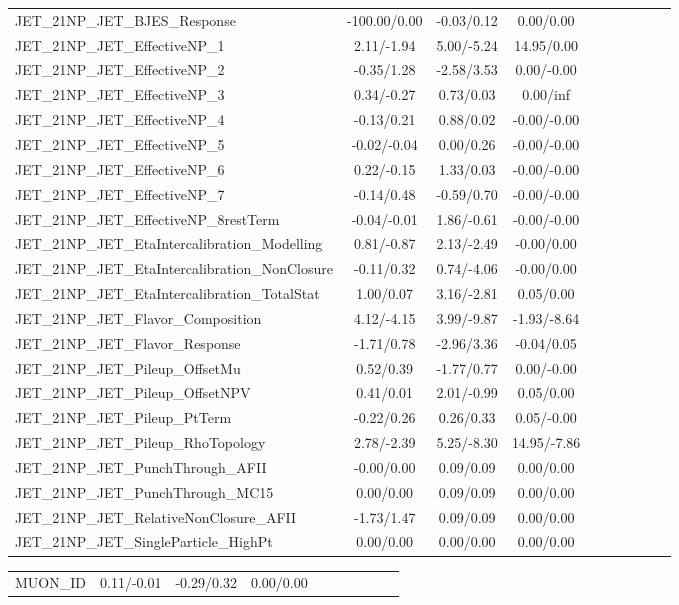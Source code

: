 \begin{table}[h]
\begin{center}
\begin{tabular}{l|ccccccccc}
JET\_21NP\_JET\_BJES\_Response &-100.00/0.00 &-0.03/0.12 &0.00/0.00 \\
JET\_21NP\_JET\_EffectiveNP\_1 &2.11/-1.94 &5.00/-5.24 &14.95/0.00 \\
JET\_21NP\_JET\_EffectiveNP\_2 &-0.35/1.28 &-2.58/3.53 &0.00/-0.00 \\
JET\_21NP\_JET\_EffectiveNP\_3 &0.34/-0.27 &0.73/0.03 &0.00/inf \\
JET\_21NP\_JET\_EffectiveNP\_4 &-0.13/0.21 &0.88/0.02 &-0.00/-0.00 \\
JET\_21NP\_JET\_EffectiveNP\_5 &-0.02/-0.04 &0.00/0.26 &-0.00/-0.00 \\
JET\_21NP\_JET\_EffectiveNP\_6 &0.22/-0.15 &1.33/0.03 &-0.00/-0.00 \\
JET\_21NP\_JET\_EffectiveNP\_7 &-0.14/0.48 &-0.59/0.70 &-0.00/-0.00 \\
JET\_21NP\_JET\_EffectiveNP\_8restTerm &-0.04/-0.01 &1.86/-0.61 &-0.00/-0.00 \\
JET\_21NP\_JET\_EtaIntercalibration\_Modelling &0.81/-0.87 &2.13/-2.49 &-0.00/0.00 \\
JET\_21NP\_JET\_EtaIntercalibration\_NonClosure &-0.11/0.32 &0.74/-4.06 &-0.00/0.00 \\
JET\_21NP\_JET\_EtaIntercalibration\_TotalStat &1.00/0.07 &3.16/-2.81 &0.05/0.00 \\
JET\_21NP\_JET\_Flavor\_Composition &4.12/-4.15 &3.99/-9.87 &-1.93/-8.64 \\
JET\_21NP\_JET\_Flavor\_Response &-1.71/0.78 &-2.96/3.36 &-0.04/0.05 \\
JET\_21NP\_JET\_Pileup\_OffsetMu &0.52/0.39 &-1.77/0.77 &0.00/-0.00 \\
JET\_21NP\_JET\_Pileup\_OffsetNPV &0.41/0.01 &2.01/-0.99 &0.05/0.00 \\
JET\_21NP\_JET\_Pileup\_PtTerm &-0.22/0.26 &0.26/0.33 &0.05/-0.00 \\
JET\_21NP\_JET\_Pileup\_RhoTopology &2.78/-2.39 &5.25/-8.30 &14.95/-7.86 \\
JET\_21NP\_JET\_PunchThrough\_AFII &-0.00/0.00 &0.09/0.09 &0.00/0.00 \\
JET\_21NP\_JET\_PunchThrough\_MC15 &0.00/0.00 &0.09/0.09 &0.00/0.00 \\
JET\_21NP\_JET\_RelativeNonClosure\_AFII &-1.73/1.47 &0.09/0.09 &0.00/0.00 \\
JET\_21NP\_JET\_SingleParticle\_HighPt &0.00/0.00 &0.00/0.00 &0.00/0.00 \\
\hline \end{tabular} \end{center} \end{table} \begin{table}[h] \scriptsize \begin{center} \begin{tabular}{l|ccccccccc} \hline MUON\_ID &0.11/-0.01 &-0.29/0.32 &0.00/0.00 \\

\end{tabular}
\end{center}
\end{table}

